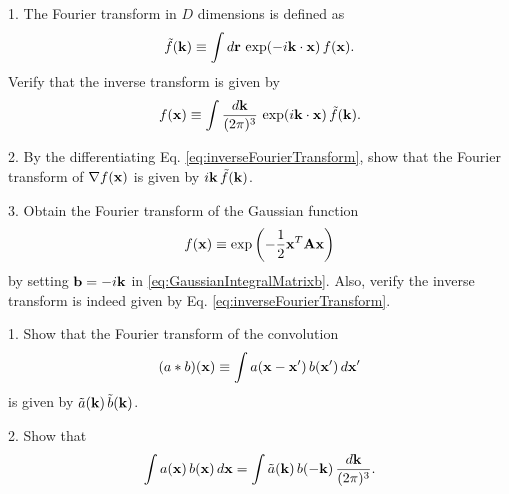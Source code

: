 \documentclass[12pt]{book}
\begin{document}






1. The Fourier transform in $D$ dimensions is defined as
\begin{equation}
  \tilde f(\vk)
\equiv
  \int d\vr \, \exp(-i\vk \cdot \vx) \, f(\vx).
  \label{eq:FourierTransform}
\end{equation}
Verify that the inverse transform is given by
\begin{equation}
  f(\vx)
\equiv
  \int \dvk \, \exp(i\vk \cdot \vx) \, \tilde f(\vk).
  \label{eq:inverseFourierTransform}
\end{equation}


2. By the differentiating Eq. \eqref{eq:inverseFourierTransform},
show that the Fourier transform of $\nabla f(\boldsymbol{\mathbf{x}})$ is given by $i\boldsymbol{\mathbf{k}} \, \tilde f(\boldsymbol{\mathbf{k}})$.

3. Obtain the Fourier transform of the Gaussian function
\[
  f(\boldsymbol{\mathbf{x}}) \equiv \exp\left( - \frac{1}{2} \boldsymbol{\mathbf{x}}^T \boldsymbol{\mathbf{A}} \boldsymbol{\mathbf{x}} \right)
\]
by setting $\boldsymbol{\mathbf{b}} = -i \boldsymbol{\mathbf{k}}$ in \eqref{eq:GaussianIntegralMatrixb}.
%
Also, verify the inverse transform
is indeed given by Eq. \eqref{eq:inverseFourierTransform}.





1. Show that the Fourier transform of the convolution
\begin{equation}
  (a*b)(\vx)
\equiv
  \int a(\vx - \vx') \, b(\vx') \, d\vx'
  \label{eq:convolution}
\end{equation}
is given by $\tilde{a}(\boldsymbol{\mathbf{k}}) \, \tilde{b}(\boldsymbol{\mathbf{k}})$.

2. Show that
\begin{equation}
  \int a(\boldsymbol{\mathbf{x}}) \, b(\boldsymbol{\mathbf{x}}) \, d\boldsymbol{\mathbf{x}}
=
  \int \tilde{a}(\boldsymbol{\mathbf{k}}) \, b(-\boldsymbol{\mathbf{k}}) \, \frac{ d \boldsymbol{\mathbf{k}} }{(2\pi)^3}.
\end{equation}




\end{document}
